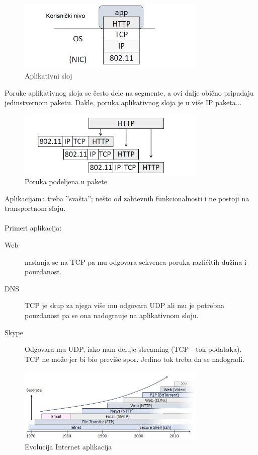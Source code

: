\documentclass{article} %
\begin{document}
\begin{figure}[H]
	\centering
	\includegraphics[width=0.8\textwidth]{slike-aplikativniSloj/aplikativni-sloj.png}
	\caption{Aplikativni sloj}\label{aplikativni sloj}
\end{figure}

\noindent Poruke aplikativnog sloja se \v cesto dele na segmente, a ovi dalje obi\v cno pripadaju jedinstvernom paketu. Dakle, poruka aplikativnog sloja je u vi\v se IP paketa...

\begin{figure}[H]
	\centering
	\includegraphics[width=0.8\textwidth]{slike-aplikativniSloj/paketi.png}
	\caption{Poruka podeljena u pakete}
\end{figure}

\noindent Aplikacijama treba ''sva\v sta''; ne\v sto od zahtevnih funkcionalnosti i ne postoji na transportnom sloju.
\\
\\ Primeri aplikacija:
\begin{description}
	\item[Web] naslanja se na TCP pa mu odgovara sekvenca poruka razli\v citih du\v zina i pouzdanost.
	\item[DNS] TCP je skup za njega vi\v se mu odgovara UDP ali mu je potrebna pouzdanost pa se ona nadogra\dj uje na aplikativnom sloju.
	\item[Skype] Odgovara mu UDP, iako nam deluje streaming (TCP - tok podataka). TCP ne mo\v ze jer bi bio previ\v se spor. Jedino tok treba da se nadogradi.
\end{description}


\begin{figure}[H]
	\centering
	\includegraphics[width=0.8\textwidth]{slike-aplikativniSloj/evolucija.png}
	\caption{Evolucija Internet aplikacija}
\end{figure}
\end{document}
